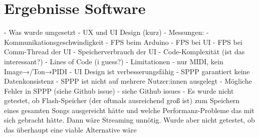 
\chapter{Ergebnisse Software} \label{ergebnisseSW}

\nocite{*}

- Was wurde umgesetzt \newline
- UX und UI Design (kurz) \newline
- Messungen: \newline
	- Kommunikationsgeschwindigkeit \newline
	- FPS beim Arduino \newline
	- FPS bei UI \newline
	- FPS bei Comm-Thread der UI \newline
	- Speicherverbrauch der UI \newline
	- Code-Komplexität (ist das interessant?) \newline
	- Lines of Code (i guess?) \newline
- Limitationen \newline
	- nur MIDI, kein Image→/Ton→PIDI \newline
	- UI Design ist verbesserungsfähig \newline
	- SPPP garantiert keine Datenkonsistenz \newline
	- SPPP ist nicht auf mehrere Nutzer:innen ausgelegt \newline
	- Mögliche Fehler in SPPP (siehe Github issue) \newline
	- siehe Github issues \newline
	- Es wurde nicht getestet, ob Flash-Speicher (der oftmals ausreichend groß ist) zum Speichern eines gesamten Songs ausgereicht hätte und welche Performanz-Probleme das mit sich gebracht hätte. Dann wäre Streaming unnötig. Wurde aber nicht getestet, ob das überhaupt eine viable Alternative wäre